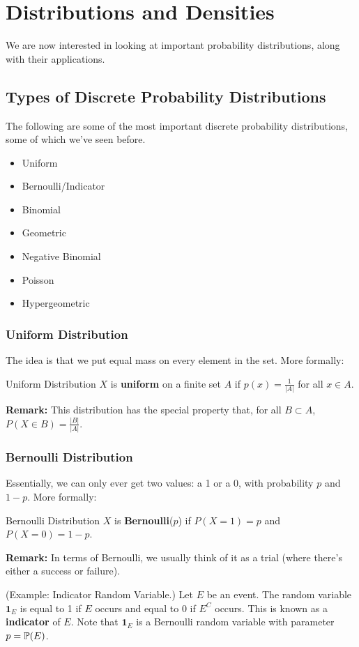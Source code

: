 \section{Distributions and Densities}
We are now interested in looking at important probability distributions, along with their applications.

\subsection{Types of Discrete Probability Distributions}
The following are some of the most important discrete probability distributions, some of which we've seen before. 
\begin{itemize}
    \item Uniform 
    \item Bernoulli/Indicator
    \item Binomial 
    \item Geometric
    \item Negative Binomial 
    \item Poisson 
    \item Hypergeometric
\end{itemize}

\subsubsection{Uniform Distribution}
The idea is that we put equal mass on every element in the set. More formally: 
\begin{definition}{Uniform Distribution}{}
    $X$ is \textbf{uniform} on a finite set $A$ if $p(x) = \frac{1}{|A|}$ for all $x \in A$. 
\end{definition}
\textbf{Remark:} This distribution has the special property that, for all $B \subset A$, $P(X \in B) = \frac{|B|}{|A|}$. 

\subsubsection{Bernoulli Distribution}
Essentially, we can only ever get two values: a 1 or a 0, with probability $p$ and $1 - p$. More formally: 
\begin{definition}{Bernoulli Distribution}{}
    $X$ is \textbf{Bernoulli}($p$) if $P(X = 1) = p$ and $P(X = 0) = 1 - p$. 
\end{definition}
\textbf{Remark:} In terms of Bernoulli, we usually think of it as a trial (where there's either a success or failure). 
\begin{mdframed}[]
    (Example: Indicator Random Variable.) Let $E$ be an event. The random variable $\mathbf{1}_E$ is equal to 1 if $E$ occurs and equal to 0 if $E^C$ occurs. This is known as a \textbf{indicator} of $E$. Note that $\mathbf{1}_E$ is a Bernoulli random variable with parameter $p = \mathbb{P}(E)$.
\end{mdframed}

